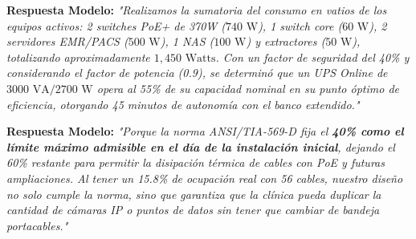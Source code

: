 \documentclass[11pt,a4paper]{article}
\begin{document}
\begin{tcolorbox}[colback=lightgray,colframe=primaryblue,title=\textbf{Pregunta 4: ¿Cómo dimensionaron el UPS de 3 kVA del rack?}]
\textbf{Respuesta Modelo:} \textit{"Realizamos la sumatoria del consumo en vatios de los equipos activos: 2 switches PoE+ de 370W ($740\text{ W}$), 1 switch core ($60\text{ W}$), 2 servidores EMR/PACS ($500\text{ W}$), 1 NAS ($100\text{ W}$) y extractores ($50\text{ W}$), totalizando aproximadamente $1,450\text{ Watts}$. Con un factor de seguridad del 40\% y considerando el factor de potencia (0.9), se determinó que un UPS Online de $3000\text{ VA} / 2700\text{ W}$ opera al 55\% de su capacidad nominal en su punto óptimo de eficiencia, otorgando 45 minutos de autonomía con el banco extendido."}
\end{tcolorbox}

\begin{tcolorbox}[colback=lightgray,colframe=primaryblue,title=\textbf{Pregunta 5: ¿Por qué la bandeja tipo malla se llenó solo al 15.8\% si la norma permite 40\%?}]
\textbf{Respuesta Modelo:} \textit{"Porque la norma ANSI/TIA-569-D fija el \textbf{40\% como el límite máximo admisible en el día de la instalación inicial}, dejando el 60\% restante para permitir la disipación térmica de cables con PoE y futuras ampliaciones. Al tener un 15.8\% de ocupación real con 56 cables, nuestro diseño no solo cumple la norma, sino que garantiza que la clínica pueda duplicar la cantidad de cámaras IP o puntos de datos sin tener que cambiar de bandeja portacables."}
\end{tcolorbox}
\end{document}
